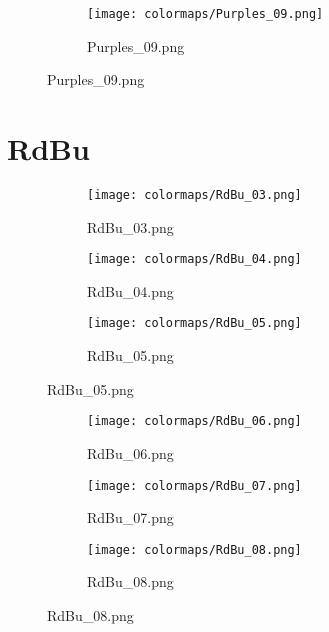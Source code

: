 \documentclass{article}%
\begin{document}
%
\hspace{1cm}\hfill%


\begin{figure}[h!]%
\begin{subfigure}[b]{0.3\linewidth}%
\texttt{[image: colormaps/Purples\_09.png]}%
\caption{Purples\_09.png}%
\end{subfigure}%
\end{figure}

%
\newpage%
\section{RdBu}%
\label{sec:RdBu}%
\hspace{1cm}\hfill%
\hspace{1cm}\hfill%
\hspace{1cm}\hfill%


\begin{figure}[h!]%
\begin{subfigure}[b]{0.3\linewidth}%
\texttt{[image: colormaps/RdBu\_03.png]}%
\caption{RdBu\_03.png}%
\end{subfigure}%
\begin{subfigure}[b]{0.3\linewidth}%
\texttt{[image: colormaps/RdBu\_04.png]}%
\caption{RdBu\_04.png}%
\end{subfigure}%
\begin{subfigure}[b]{0.3\linewidth}%
\texttt{[image: colormaps/RdBu\_05.png]}%
\caption{RdBu\_05.png}%
\end{subfigure}%
\end{figure}

%
\hspace{1cm}\hfill%
\hspace{1cm}\hfill%
\hspace{1cm}\hfill%


\begin{figure}[h!]%
\begin{subfigure}[b]{0.3\linewidth}%
\texttt{[image: colormaps/RdBu\_06.png]}%
\caption{RdBu\_06.png}%
\end{subfigure}%
\begin{subfigure}[b]{0.3\linewidth}%
\texttt{[image: colormaps/RdBu\_07.png]}%
\caption{RdBu\_07.png}%
\end{subfigure}%
\begin{subfigure}[b]{0.3\linewidth}%
\texttt{[image: colormaps/RdBu\_08.png]}%
\caption{RdBu\_08.png}%
\end{subfigure}%
\end{figure}
\end{document}
